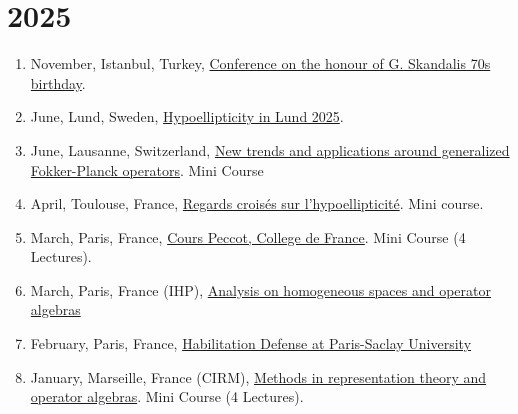 \documentclass[a4paper, 13pt]{article}
\begin{document}
\section*{2025}
  \begin{enumerate}
    \item November, Istanbul, Turkey, \href{}{Conference on the honour of G. Skandalis 70s birthday}.
    \item June, Lund, Sweden, \href{https://www.maths.lu.se/english/research/seminars/hypoellipticity-in-lund-2025/}{Hypoellipticity in Lund 2025}.
    \item June, Lausanne, Switzerland, \href{https://bernoulli.epfl.ch/programs/new-trends-and-applications-around-generalized-fokker-planck-operators/}{New trends and applications around generalized Fokker-Planck operators}. Mini Course 
    \item April, Toulouse, France, \href{https://indico.math.cnrs.fr/event/13702/overview}{Regards croisés sur l'hypoellipticité}. Mini course.
    \item March, Paris, France, \href{https://www.college-de-france.fr/fr/agenda/conferencier-invite/on-maximal-hypoellipticity-and-sub-riemannian-geometry}{Cours Peccot, College de France}. Mini Course (4 Lectures).
    \item March, Paris, France (IHP), \href{https://indico.math.cnrs.fr/event/10858/}{Analysis on homogeneous spaces and operator algebras}
    \item February, Paris, France, \href{https://www.imo.universite-paris-saclay.fr/en/events/7558}{Habilitation Defense at Paris-Saclay University}
    \item January,  Marseille, France (CIRM), \href{https://conferences.cirm-math.fr/3227.html}{Methods in representation theory and operator algebras}. Mini Course (4 Lectures).
  \end{enumerate}
\end{document}
